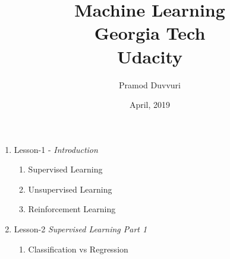 \documentclass[11pt]{article}
\title{Machine Learning \\
	\large Georgia Tech \\
	Udacity}
\author{Pramod Duvvuri}
\date{April, 2019}
\begin{document}
	\maketitle
	\begin{enumerate}
		\item Lesson-1 - \textit{Introduction}
			\begin{enumerate}
			\item Supervised Learning
			\item Unsupervised Learning
			\item Reinforcement Learning
		\end{enumerate}
	    \item Lesson-2 \textit{Supervised Learning Part 1}
	    	\begin{enumerate}
	    	\item Classification vs Regression
	    \end{enumerate}
	\end{enumerate}
\end{document}
